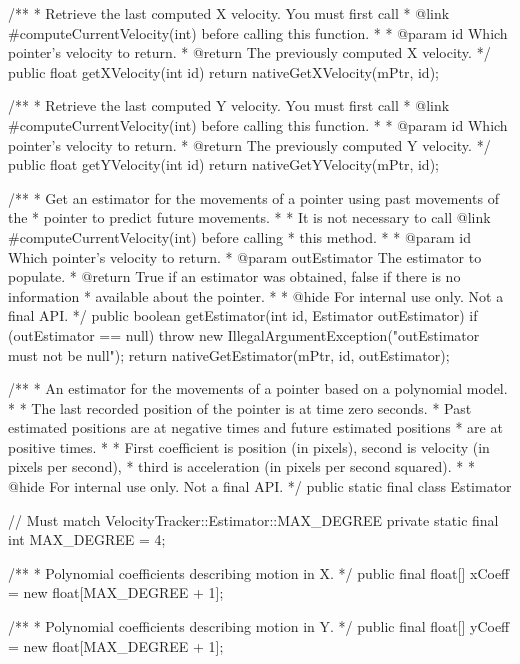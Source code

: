 {    /**
     * Retrieve the last computed X velocity.  You must first call
     * {@link #computeCurrentVelocity(int)} before calling this function.
     * 
     * @param id Which pointer's velocity to return.
     * @return The previously computed X velocity.
     */
    public float getXVelocity(int id) {
        return nativeGetXVelocity(mPtr, id);
    }
    
    /**
     * Retrieve the last computed Y velocity.  You must first call
     * {@link #computeCurrentVelocity(int)} before calling this function.
     * 
     * @param id Which pointer's velocity to return.
     * @return The previously computed Y velocity.
     */
    public float getYVelocity(int id) {
        return nativeGetYVelocity(mPtr, id);
    }

    /**
     * Get an estimator for the movements of a pointer using past movements of the
     * pointer to predict future movements.
     *
     * It is not necessary to call {@link #computeCurrentVelocity(int)} before calling
     * this method.
     *
     * @param id Which pointer's velocity to return.
     * @param outEstimator The estimator to populate.
     * @return True if an estimator was obtained, false if there is no information
     * available about the pointer.
     *
     * @hide For internal use only.  Not a final API.
     */
    public boolean getEstimator(int id, Estimator outEstimator) {
        if (outEstimator == null) {
            throw new IllegalArgumentException("outEstimator must not be null");
        }
        return nativeGetEstimator(mPtr, id, outEstimator);
    }

    /**
     * An estimator for the movements of a pointer based on a polynomial model.
     *
     * The last recorded position of the pointer is at time zero seconds.
     * Past estimated positions are at negative times and future estimated positions
     * are at positive times.
     *
     * First coefficient is position (in pixels), second is velocity (in pixels per second),
     * third is acceleration (in pixels per second squared).
     *
     * @hide For internal use only.  Not a final API.
     */
    public static final class Estimator {
        // Must match VelocityTracker::Estimator::MAX_DEGREE
        private static final int MAX_DEGREE = 4;

        /**
         * Polynomial coefficients describing motion in X.
         */
        public final float[] xCoeff = new float[MAX_DEGREE + 1];

        /**
         * Polynomial coefficients describing motion in Y.
         */
        public final float[] yCoeff = new float[MAX_DEGREE + 1];

}}
